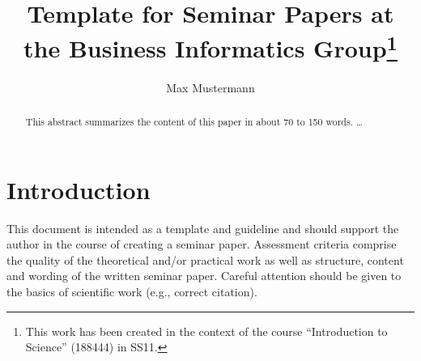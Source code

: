 \documentclass{llncs}
\begin{document}
\pagestyle{plain}

\title{Template for Seminar Papers at the Business Informatics Group\footnote{This work has been created in the context of the course ``Introduction to Science'' (188444) in SS11.}}


\author{Max Mustermann}




\maketitle

\begin{abstract}

This abstract summarizes the content of this paper in about 70 to 150 words. \dots
\end{abstract}

\tableofcontents
\newpage


\section{Introduction}

This document is intended as a template and guideline and should support the author in the course of creating a seminar paper. Assessment criteria comprise the quality of the theoretical and/or practical work as well as structure, content and wording of the written seminar paper. Careful attention should be given to the basics of scientific work (e.g., correct citation).
\end{document}

